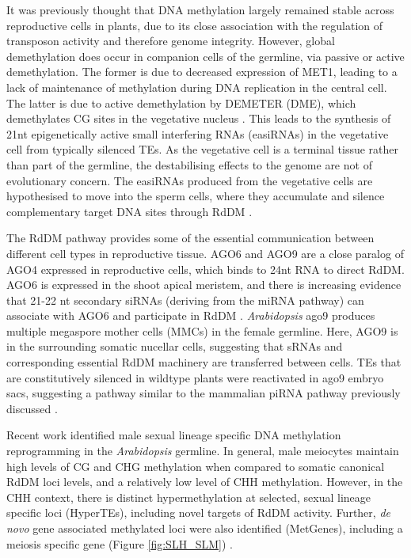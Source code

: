 It was previously thought that DNA methylation largely remained stable across reproductive cells in plants, due to its close association with the regulation of transposon activity \cite{RN247} and therefore genome integrity. However, global demethylation does occur in companion cells of the germline, via passive or active demethylation. The former is due to decreased expression of MET1, leading to a lack of maintenance of methylation during DNA replication in the central cell. The latter is due to active demethylation by DEMETER (DME), which demethylates CG sites in the vegetative nucleus \cite{RN235,RN57}. This leads to the synthesis of 21nt epigenetically active small interfering RNAs (easiRNAs) in the vegetative cell from typically silenced TEs. As the vegetative cell is a terminal tissue rather than part of the germline, the destabilising effects to the genome are not of evolutionary concern. The easiRNAs produced from the vegetative cells are hypothesised to move into the sperm cells, where they accumulate and silence complementary target DNA sites through RdDM \cite{RN14,RN16}.

The RdDM pathway provides some of the essential communication between different cell types in reproductive tissue. AGO6 and AGO9 are a close paralog of AGO4 expressed in reproductive cells, which binds to 24nt RNA to direct RdDM. AGO6 is expressed in the shoot apical meristem, and there is increasing evidence that 21-22 nt secondary siRNAs (deriving from the miRNA pathway) can associate with AGO6 and participate in RdDM \cite{RN133,RN61,RN33}. \textit{Arabidopsis} ago9 produces multiple megaspore mother cells (MMCs) in the female germline. Here, AGO9 is in the surrounding somatic nucellar cells, suggesting that sRNAs and corresponding essential RdDM machinery are transferred between cells.  TEs that are constitutively silenced in wildtype plants were reactivated in ago9 embryo sacs, suggesting a pathway similar to the mammalian piRNA pathway previously discussed \cite{RN14}.

Recent work identified male sexual lineage specific DNA methylation reprogramming in the \textit{Arabidopsis} germline. In general, male meiocytes maintain high levels of CG and CHG methylation when compared to somatic canonical RdDM loci levels, and a relatively low level of CHH methylation. However, in the CHH context, there is distinct hypermethylation at selected, sexual lineage specific loci (HyperTEs), including novel targets of RdDM activity. Further, \textit{de novo} gene associated methylated loci were also identified (MetGenes), including a meiosis specific gene (Figure \ref{fig:SLH_SLM}) \cite{RN199}.

